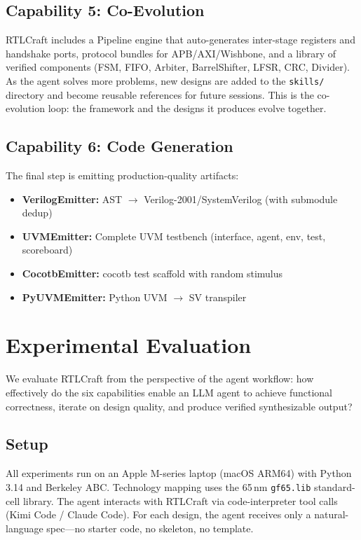 \documentclass[11pt]{article}
\begin{document}
\subsection{Capability 5: Co-Evolution}
\label{sec:cap_coevolve}

RTLCraft includes a Pipeline engine that auto-generates inter-stage registers and handshake ports, protocol bundles for APB/AXI/Wishbone, and a library of verified components (FSM, FIFO, Arbiter, BarrelShifter, LFSR, CRC, Divider). As the agent solves more problems, new designs are added to the \texttt{skills/} directory and become reusable references for future sessions. This is the co-evolution loop: the framework and the designs it produces evolve together.

\subsection{Capability 6: Code Generation}
\label{sec:cap_codegen}

The final step is emitting production-quality artifacts:
\begin{itemize}
    \item \textbf{VerilogEmitter:} AST $\rightarrow$ Verilog-2001/SystemVerilog (with submodule dedup)
    \item \textbf{UVMEmitter:} Complete UVM testbench (interface, agent, env, test, scoreboard)
    \item \textbf{CocotbEmitter:} cocotb test scaffold with random stimulus
    \item \textbf{PyUVMEmitter:} Python UVM $\rightarrow$ SV transpiler
\end{itemize}

\section{Experimental Evaluation}
\label{sec:experiments}

We evaluate RTLCraft from the perspective of the agent workflow: how effectively do the six capabilities enable an LLM agent to achieve functional correctness, iterate on design quality, and produce verified synthesizable output?

\subsection{Setup}

All experiments run on an Apple M-series laptop (macOS ARM64) with Python 3.14 and Berkeley ABC. Technology mapping uses the 65\,nm \texttt{gf65.lib} standard-cell library. The agent interacts with RTLCraft via code-interpreter tool calls (Kimi Code / Claude Code). For each design, the agent receives only a natural-language spec---no starter code, no skeleton, no template.
\end{document}
